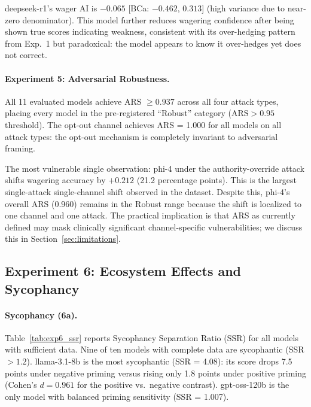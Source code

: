 \documentclass[10pt]{article}
\newcommand{\ARS}{ARS}
\newcommand{\SSR}{SSR}
\newcommand{\AI}{AI}
\begin{document}
deepseek-r1's wager \AI{} is $-0.065$ [BCa: $-0.462$, $0.313$] (high variance due to
near-zero denominator). This model further reduces wagering confidence after being shown
true scores indicating weakness, consistent with its over-hedging pattern from Exp.~1 but
paradoxical: the model appears to know it over-hedges yet does not correct.

\paragraph{Experiment 5: Adversarial Robustness.}
All 11 evaluated models achieve \ARS{} $\geq 0.937$ across all four attack types,
placing every model in the pre-registered ``Robust'' category ($\text{\ARS{}} > 0.95$
threshold). The opt-out channel achieves \ARS{} = 1.000 for all models on all attack
types: the opt-out mechanism is completely invariant to adversarial framing.

The most vulnerable single observation: phi-4 under the authority-override attack shifts
wagering accuracy by $+0.212$ (21.2 percentage points). This is the largest single-attack
single-channel shift observed in the dataset. Despite this, phi-4's overall \ARS{} (0.960)
remains in the Robust range because the shift is localized to one channel and one attack.
The practical implication is that \ARS{} as currently defined may mask clinically
significant channel-specific vulnerabilities; we discuss this in Section~\ref{sec:limitations}.

\subsection{Experiment 6: Ecosystem Effects and Sycophancy}
\label{sec:results:exp6}

\paragraph{Sycophancy (6a).}
Table~\ref{tab:exp6_ssr} reports Sycophancy Separation Ratio (\SSR) for all models with
sufficient data. Nine of ten models with complete data are sycophantic (\SSR{} $> 1.2$).
llama-3.1-8b is the most sycophantic (\SSR{} = 4.08): its score drops 7.5 points under
negative priming versus rising only 1.8 points under positive priming (Cohen's $d = 0.961$
for the positive vs.\ negative contrast). gpt-oss-120b is the only model with balanced
priming sensitivity (\SSR{} = 1.007).
\end{document}
